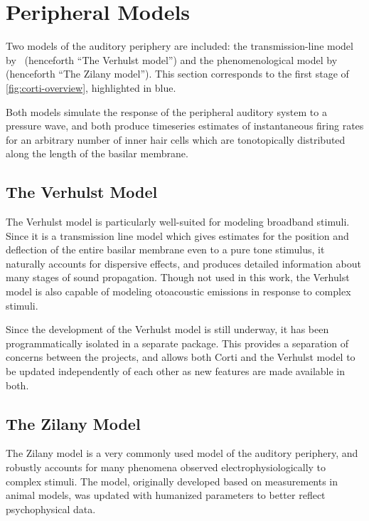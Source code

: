 \section{Peripheral Models} %
\label{sec:peripheral_models}
Two models of the auditory periphery are included: the transmission-line model by~\cite{Verhulst2015Functional} (henceforth ``The Verhulst model'') and the phenomenological model by~\cite{Zilany2014Updated} (henceforth ``The Zilany model'').  This section corresponds to the first stage of \autoref{fig:corti-overview}, highlighted in blue.

Both models simulate the response of the peripheral auditory system to a pressure wave, and both produce timeseries estimates of instantaneous firing rates for an arbitrary number of inner hair cells which are tonotopically distributed along the length of the basilar membrane. 

\subsection{The Verhulst Model} %
\label{sub:the_verhulst_model1}
The Verhulst model is particularly well-suited for modeling broadband stimuli.  Since it is a transmission line model which gives estimates for the position and deflection of the entire basilar membrane even to a pure tone stimulus, it naturally accounts for dispersive effects, and produces detailed information about many stages of sound propagation. Though not used in this work, the Verhulst model is also capable of modeling otoacoustic emissions in response to complex stimuli. 

Since the development of the Verhulst model is still underway, it has been programmatically isolated in a separate package.  This provides a separation of concerns between the projects, and allows both Corti and the Verhulst model to be updated independently of each other as new features are made available in both.
\subsection{The Zilany Model} %
\label{sub:the_zilany_model}
The Zilany model is a very commonly used model of the auditory periphery, and robustly accounts for many phenomena observed electrophysiologically to complex stimuli.  The model, originally developed based on measurements in animal models, was updated with humanized parameters to better reflect psychophysical data\citep{Zilany2014Updated,Zilany2007Predictions,Zilany2006Modeling}. 

